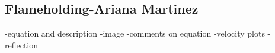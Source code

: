 \subsection{Flameholding-Ariana Martinez}

-equation and description
-image
-comments on equation
-velocity plots
-reflection
